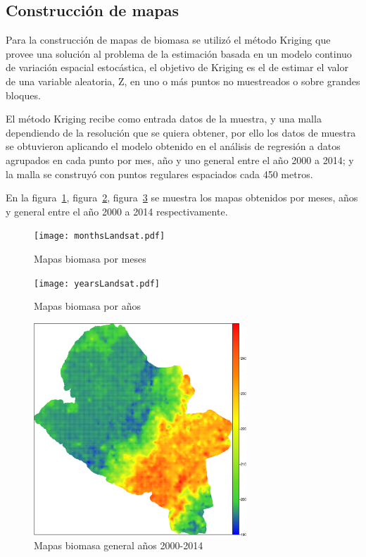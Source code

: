 \subsection{Construcción de mapas}

Para la construcción de mapas de biomasa se utilizó el método Kriging que provee una solución al problema 
de la estimación basada en un modelo continuo de variación espacial estocástica, el objetivo de Kriging es el de estimar el valor de una 
variable aleatoria, Z, en uno o más puntos no muestreados o sobre grandes bloques. 

El método Kriging recibe como entrada datos de la muestra, y una malla dependiendo de la resolución que se quiera obtener, por ello los datos de muestra se
obtuvieron aplicando el modelo obtenido en el análisis de regresión a datos agrupados en cada punto por mes, año y uno general entre el año 2000 a 2014; y la 
 malla se construyó con puntos regulares espaciados cada 450 metros. 
 
 En la figura~\ref{fig:biomasaMes}, figura~\ref{fig:biomasaAnio}, figura~\ref{fig:biomasaTotal}  se muestra los mapas obtenidos por meses, años y general entre el año 2000 a 2014 respectivamente. 
 
\begin{figure}
  \centering
  \texttt{[image: monthsLandsat.pdf]}
  \caption{Mapas biomasa por meses}
  \label{fig:biomasaMes}
\end{figure}

\begin{figure}
  \centering
  \texttt{[image: yearsLandsat.pdf]}
  \caption{Mapas biomasa por años}
  \label{fig:biomasaAnio}
\end{figure}

\begin{figure}
  \centering
  \includegraphics[width = 8cm]{generalLandsat.pdf}
  \caption{Mapas biomasa general años 2000-2014}
  \label{fig:biomasaTotal}
\end{figure}
